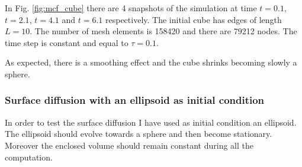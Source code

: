 \documentclass[a4paper,11pt, onecolumn]{article}
\begin{document}
\noindent In Fig. \ref{fig:mcf_cube} there are 4 snapshots of the simulation at time $t=0.1$, $t=2.1$, $t=4.1$ and $t=6.1$ respectively. The initial cube  has edges of length $L=10$. The number of mesh elements is 158420 and there are 79212 nodes. The time step is constant and equal to $\tau=0.1$.
\newline

\noindent As expected, there is a smoothing effect and the cube shrinks becoming slowly a sphere. 

\subsubsection{Surface diffusion with an ellipsoid as initial condition}

In order to test the surface diffusion I have used as initial condition an ellipsoid. The ellipsoid should evolve towards a sphere and then become stationary. Moreover the enclosed volume should remain constant during all the computation.
\end{document}
